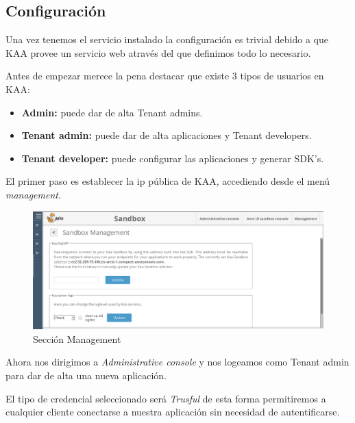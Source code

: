 \subsection{Configuración}

Una vez tenemos el servicio instalado la configuración es trivial debido a que KAA provee un servicio web através del que definimos todo lo necesario.

Antes de empezar merece la pena destacar que existe 3 tipos de usuarios en KAA:

\begin{itemize}
	\item \textbf{Admin: } puede dar de alta Tenant admins.
	\item \textbf{Tenant admin: } puede dar de alta aplicaciones y Tenant developers.
	\item \textbf{Tenant developer:} puede configurar las aplicaciones y generar SDK's.
\end{itemize}

\bigskip

El primer paso es establecer la ip pública de KAA, accediendo desde el menú \textit{management}.

\begin{figure}[!ht]
  \begin{center}
    \includegraphics[scale=0.30]{../images/kaa/8.png}
		\caption{Sección Management}
    \label{fig:kaa}
	\end{center}
\end{figure}

\newpage

Ahora nos dirigimos a \textit{Administrative console} y nos logeamos como Tenant admin para dar de alta una nueva aplicación.

El tipo de credencial seleccionado será \textit{Trusful} de esta forma permitiremos a cualquier cliente conectarse a nuestra aplicación sin necesidad de autentificarse.

